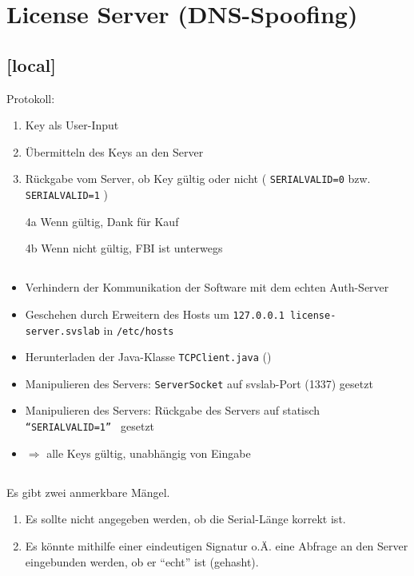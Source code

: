 \documentclass[twoside]{article}
\newcommand{\say}[1]{%
	``#1''%
}
\newcommand{\ttt}[1]{%
	\texttt{#1}%
}
\begin{document}
\section{License Server (DNS-Spoofing)}
\subsection{[local]}
Protokoll:
\begin{enumerate}
	\item Key als User-Input
	\item Übermitteln des Keys an den Server
	\item Rückgabe vom Server, ob Key gültig oder nicht (\ttt{SERIAL\textunderscore VALID=0} bzw. \ttt{SERIAL\textunderscore VALID=1})
	\item[4a] Wenn gültig, Dank für Kauf
	\item[4b] Wenn nicht gültig, FBI ist unterwegs
\end{enumerate}
\subsection{}
\begin{itemize}
	\item Verhindern der Kommunikation der Software mit dem echten Auth-Server
	\item Geschehen durch Erweitern des Hosts um \ttt{127.0.0.1    license-server.svslab} in \ttt{/etc/hosts}
	\item Herunterladen der Java-Klasse \ttt{TCPClient.java} (\cite{javatcp})
	\item Manipulieren des Servers: \ttt{ServerSocket} auf svslab-Port (1337) gesetzt
	\item Manipulieren des Servers: Rückgabe des Servers auf statisch \ttt{\say{SERIAL\textunderscore VALID=1}} gesetzt
	\item $\Longrightarrow$ alle Keys gültig, unabhängig von Eingabe
\end{itemize} 
\subsection{}
Es gibt zwei anmerkbare Mängel.
\begin{enumerate}
	\item Es sollte nicht angegeben werden, ob die Serial-Länge korrekt ist.
	\item Es könnte mithilfe einer eindeutigen Signatur o.Ä. eine Abfrage an den Server eingebunden werden, ob er \say{echt} ist (gehasht).
\end{enumerate}
\end{document}
